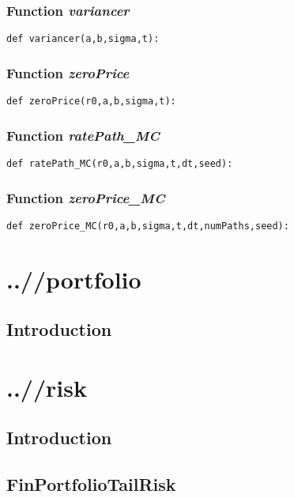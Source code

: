 \documentclass[twoside,11pt]{book}
\begin{document}
\subsection{Function {\it variancer}}


\begin{lstlisting}
def variancer(a,b,sigma,t):
\end{lstlisting}

\subsection{Function {\it zeroPrice}}


\begin{lstlisting}
def zeroPrice(r0,a,b,sigma,t):
\end{lstlisting}

\subsection{Function {\it ratePath\_MC}}


\begin{lstlisting}
def ratePath_MC(r0,a,b,sigma,t,dt,seed):
\end{lstlisting}

\subsection{Function {\it zeroPrice\_MC}}


\begin{lstlisting}
def zeroPrice_MC(r0,a,b,sigma,t,dt,numPaths,seed):
\end{lstlisting}


\chapter{..//portfolio}
\section{Introduction}


\chapter{..//risk}
\section{Introduction}

\newpage
\section{FinPortfolioTailRisk}
\end{document}
